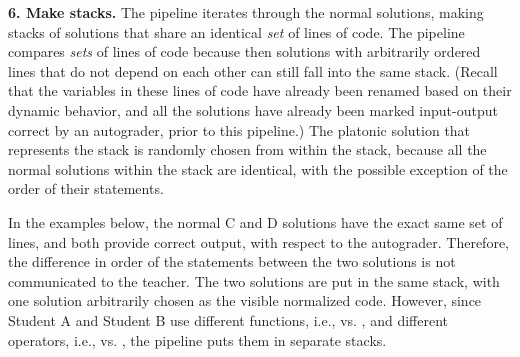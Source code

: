 {\bf 6. Make stacks.} The pipeline iterates through the normal solutions, making stacks of solutions that share an identical {\it set} of lines of code. The pipeline compares {\it sets} of lines of code because then solutions with arbitrarily ordered lines that do not depend on each other can still fall into the same stack. (Recall that the variables in these lines of code have already been renamed based on their dynamic behavior, and all the solutions have already been marked input-output correct by an autograder, prior to this pipeline.) The platonic solution that represents the stack is randomly chosen from within the stack, because all the normal solutions within the stack are identical, with the possible exception of the order of their statements. 

In the examples below, the normal C and D solutions have the exact same set of lines, and both provide correct output, with respect to the autograder. Therefore, the difference in order of the statements between the two solutions is not communicated to the teacher. The two solutions are put in the same stack, with one solution arbitrarily chosen as the visible normalized code. However, since Student A and Student B use different functions, i.e.,  vs. , and different operators, i.e., \codevar{*=} vs. \codevar{=,*}, the pipeline puts them in separate stacks.

